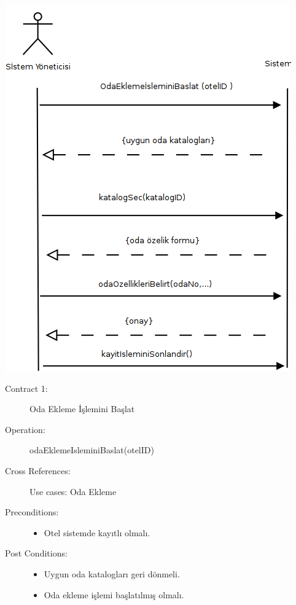 \documentclass[12pt,a4paper]{report}
\begin{document}
\newpage

\begin{center}
\includegraphics{dia/ssd-usecase3.png}
\end{center}

\newpage


\begin{description}
\item[Contract 1:] Oda Ekleme İşlemini Başlat
\item[Operation:] odaEklemeIsleminiBaslat(otelID)
\item[Cross References:] Use cases: Oda Ekleme
\item[Preconditions:] \hspace{10 mm}
\begin{itemize}
\item Otel sistemde kayıtlı olmalı.
\end{itemize}
\item[Post Conditions:] \hspace{10 mm}
\begin{itemize} 
\item Uygun oda katalogları geri dönmeli.
\item Oda ekleme işlemi başlatılmış olmalı. \\
\end{itemize}
\end{description}
\end{document}
